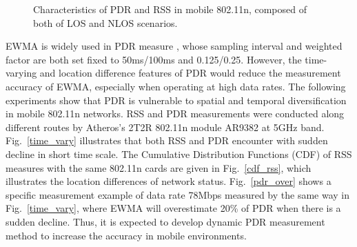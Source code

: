 \documentclass[draftclsnofoot,journal,onecolumn,11pt]{IEEEtran}
\begin{document}
\begin{figure}[!htp]
\centerline{
}
\caption{Characteristics of PDR and RSS in mobile 802.11n, composed of both of LOS and NLOS scenarios.}
\label{time}
\end{figure}

EWMA is widely used in PDR measure \cite{ath9k} \cite{minstrel} \cite{wong2008wireless}, whose sampling interval and weighted factor are both set fixed to 50ms/100ms and 0.125/0.25. However, the time-varying and location difference features of PDR would reduce the measurement accuracy of EWMA, especially when operating at high data rates. The following experiments show that PDR is vulnerable to spatial and temporal diversification in mobile 802.11n networks. RSS and PDR measurements were conducted along different routes by Atheros's 2T2R 802.11n module AR9382 at 5GHz band. Fig.~\ref{time_vary} illustrates that both RSS and PDR encounter with sudden decline in short time scale. The Cumulative Distribution Functions (CDF) of RSS measures with the same 802.11n cards are given in Fig.~\ref{cdf_rss}, which illustrates the location differences of network status. Fig.~\ref{pdr_over} shows a specific measurement example of data rate 78Mbps measured by the same way in Fig.~\ref{time_vary}, where EWMA will overestimate 20\% of PDR when there is a sudden decline. Thus, it is expected to develop dynamic PDR measurement method to increase the accuracy in mobile environments.
\end{document}
